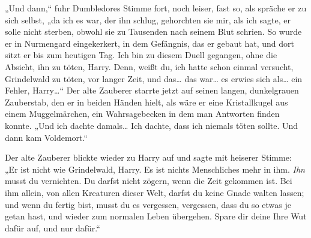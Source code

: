 „Und dann,“ fuhr Dumbledores Stimme fort, noch leiser, fast so, als spräche er zu sich selbst, „da ich es war, der ihn schlug, gehorchten sie mir, als ich sagte, er solle nicht sterben, obwohl sie zu Tausenden nach seinem Blut schrien. So wurde er in Nurmengard eingekerkert, in dem Gefängnis, das er gebaut hat, und dort sitzt er bis zum heutigen Tag. Ich bin zu diesem Duell gegangen, ohne die Absicht, ihn zu töten, Harry. Denn, weißt du, ich hatte schon einmal versucht, Grindelwald zu töten, vor langer Zeit, und das… das war… es erwies sich als… ein Fehler, Harry…“ Der alte Zauberer starrte jetzt auf seinen langen, dunkelgrauen Zauberstab, den er in beiden Händen hielt, als wäre er eine Kristallkugel aus einem Muggelmärchen, ein Wahrsagebecken in dem man Antworten finden konnte. „Und ich dachte damals… Ich dachte, dass ich niemals töten sollte. Und dann kam Voldemort.“

Der alte Zauberer blickte wieder zu Harry auf und sagte mit heiserer Stimme: „Er ist nicht wie Grindelwald, Harry. Es ist nichts Menschliches mehr in ihm. \emph{Ihn} musst du vernichten. Du darfst nicht zögern, wenn die Zeit gekommen ist. Bei ihm allein, von allen Kreaturen dieser Welt, darfst du keine Gnade walten lassen; und wenn du fertig bist, musst du es vergessen, vergessen, dass du so etwas je getan hast, und wieder zum normalen Leben übergehen. Spare dir deine Ihre Wut dafür auf, und nur dafür.“

